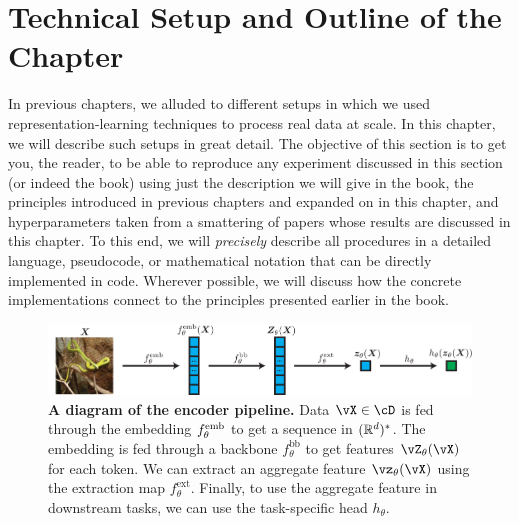 \documentclass[../../book-main.tex]{subfiles}
\begin{document}



\section{Technical Setup and Outline of the Chapter}\label{sec:experiment_setup}

In previous chapters, we alluded to different setups in which we used representation-learning techniques to process real data at scale. In this chapter, we will describe such setups in great detail. The objective of this section is to get you, the reader, to be able to reproduce any experiment discussed in this section (or indeed the book) using just the description we will give in the book, the principles introduced in previous chapters and expanded on in this chapter, and hyperparameters taken from a smattering of papers whose results are discussed in this chapter. To this end, we will \textit{precisely} describe all procedures in a detailed language, pseudocode, or mathematical notation that can be directly implemented in code. Wherever possible, we will discuss how the concrete implementations connect to the principles presented earlier in the book.

\begin{figure}
    \includegraphics[width=\textwidth]{chapters/chapter7/figs/encoder_pipeline.pdf}
    \caption{\small\textbf{A diagram of the encoder pipeline.} Data \(\vX \in \cD\) is fed through the embedding \(f_{\theta}^{\mathrm{emb}}\) to get a sequence in \((\mathbb{R}^{d})^{*}\). The embedding is fed through a backbone \(f_{\theta}^{\mathrm{bb}}\) to get features \(\vZ_{\theta}(\vX)\) for each token. We can extract an aggregate feature \(\vz_{\theta}(\vX)\) using the extraction map \(f_{\theta}^{\mathrm{ext}}\). Finally, to use the aggregate feature in downstream tasks, we can use the task-specific head \(h_{\theta}\).}
    \label{fig:overall_encoder_pipeline}
\end{figure}
\end{document}
